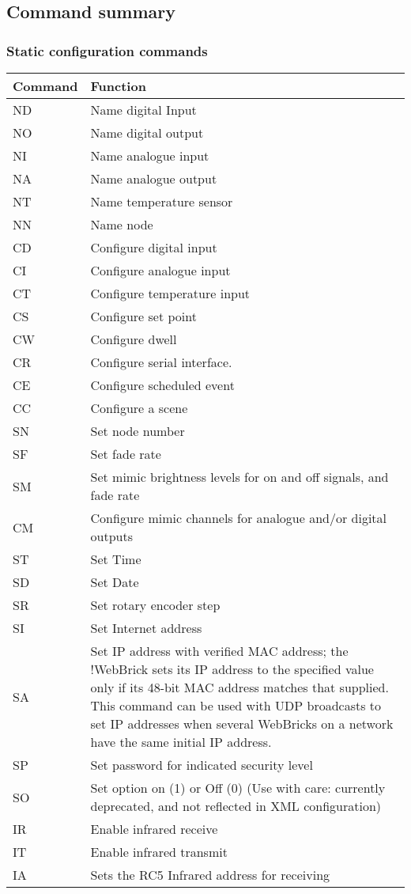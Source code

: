 \subsection{Command summary}

\subsubsection{Static configuration commands}

\begin{tabular}{l|p{12cm}}
Command&Function\\
\hline
ND&Name digital Input\\
NO&Name digital output\\
NI&Name analogue input\\
NA&Name analogue output\\
NT&Name temperature sensor\\
NN&Name node\\
CD&Configure digital input\\
CI&Configure analogue input\\
CT&Configure temperature input\\
CS&Configure set point\\
CW&Configure dwell\\
CR&Configure serial interface.\\
CE&Configure scheduled event\\
CC&Configure a scene\\
SN&Set node number\\
SF&Set fade rate\\
SM&Set mimic brightness levels for on and off signals, and fade rate\\
CM&Configure mimic channels for analogue and/or digital outputs\\
ST&Set Time\\
SD&Set Date\\
SR&Set rotary encoder step\\
SI&Set Internet address\\
SA&Set IP address with verified MAC address; the !WebBrick sets its IP address to the specified value only if its 48-bit MAC address matches that supplied.  This command can be used with UDP broadcasts to set IP addresses when several WebBricks on a network have the same initial IP address.\\
SP&Set password for indicated security level\\
SO&Set option on (1) or Off (0) (Use with care: currently deprecated, and not reflected in XML configuration)\\
IR&Enable infrared receive\\
IT&Enable infrared transmit\\
IA&Sets the RC5 Infrared address for receiving\\
\end{tabular}

